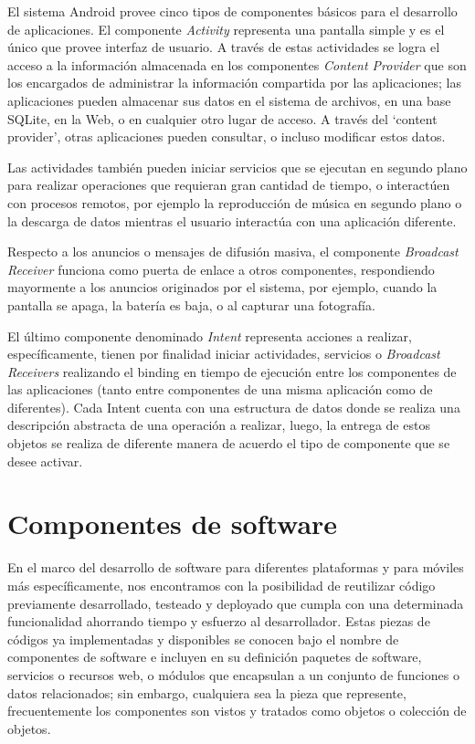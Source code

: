 El sistema Android provee cinco tipos de componentes básicos para
el desarrollo de aplicaciones. El componente \emph{Activity }representa
una pantalla simple y es el único que provee interfaz de usuario.
A través de estas actividades se logra el acceso a la información
almacenada en los componentes \emph{Content Provider }que son los
encargados de administrar la información compartida por las aplicaciones;
las aplicaciones pueden almacenar sus datos en el sistema de archivos,
en una base SQLite, en la Web, o en cualquier otro lugar de acceso.
A través del ‘content provider’, otras aplicaciones pueden consultar,
o incluso modificar estos datos. 

Las actividades también pueden iniciar servicios que se ejecutan en
segundo plano para realizar operaciones que requieran gran cantidad
de tiempo, o interactúen con procesos remotos, por ejemplo la reproducción
de música en segundo plano o la descarga de datos mientras el usuario
interactúa con una aplicación diferente. 

Respecto a los anuncios o mensajes de difusión masiva, el componente
\emph{Broadcast Receiver} funciona como puerta de enlace a otros componentes,
respondiendo mayormente a los anuncios originados por el sistema,
por ejemplo, cuando la pantalla se apaga, la batería es baja, o al
capturar una fotografía. 

El último componente denominado \emph{Intent} representa acciones
a realizar, específicamente, tienen por finalidad iniciar actividades,
servicios o \emph{Broadcast Receivers} realizando el binding en tiempo
de ejecución entre los componentes de las aplicaciones (tanto entre
componentes de una misma aplicación como de diferentes). Cada Intent
cuenta con una estructura de datos donde se realiza una descripción
abstracta de una operación a realizar, luego, la entrega de estos
objetos se realiza de diferente manera de acuerdo el tipo de componente
que se desee activar. 


\section{Componentes de software\label{sec:Componentes-de-software}}

En el marco del desarrollo de software para diferentes plataformas
y para móviles más específicamente, nos encontramos con la posibilidad
de reutilizar código previamente desarrollado, testeado y deployado
que cumpla con una determinada funcionalidad ahorrando tiempo y esfuerzo
al desarrollador. Estas piezas de códigos ya implementadas y disponibles
se conocen bajo el nombre de componentes de software e incluyen en
su definición paquetes de software, servicios o recursos web, o módulos
que encapsulan a un conjunto de funciones o datos relacionados; sin
embargo, cualquiera sea la pieza que represente, frecuentemente los
componentes son vistos y tratados como objetos o colección de objetos. 

